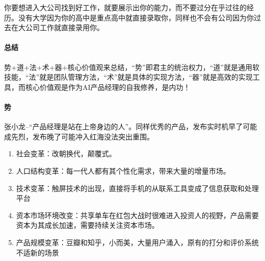 \documentclass[letterpaper,10pt,english]{sphinxmanual}
\begin{document}
你要想进入大公司找到好工作，就要展示出你的能力，而不要过分在乎过往的经历。没有大学因为你的高中是重点高中就直接录取你，同样也不会有公司因为你过去在大公司工作就直接录用你。


\paragraph{总结}
\label{\detokenize{chapter_introduction/ability:id3}}
势+道+法+术+器+核心价值观来总结，“势”即君主的统治权力，“道”就是通用软技能，“法”就是团队管理方法，“术”就是具体的实现方法，“器”就是高效的实现工具，而核心价值观是作为AI产品经理的自我修养，是内功！


\paragraph{势}
\label{\detokenize{chapter_introduction/ability:id4}}
张小龙–“产品经理是站在上帝身边的人”。同样优秀的产品，发布实时机早了可能成先烈，发布晚了可能冲入红海没法突出重围。
\begin{enumerate}
%
\item {} 
社会变革：改朝换代，颠覆式。

\item {} 
人口结构变革：每一代人都有其个性化需求，带来大量的增量市场。

\item {} 
技术变革：触屏技术的出现，直接将手机的从联系工具变成了信息获取和处理平台

\item {} 
资本市场环境改变：共享单车在红包大战时很难进入投资人的视野，产品需要资本为其成长加速，需要持续关注资本市场。

\item {} 
产品规模变革：豆瓣和知乎，小而美，大量用户涌入，原有的打分和评价系统不适新的场景

\end{enumerate}
\end{document}
